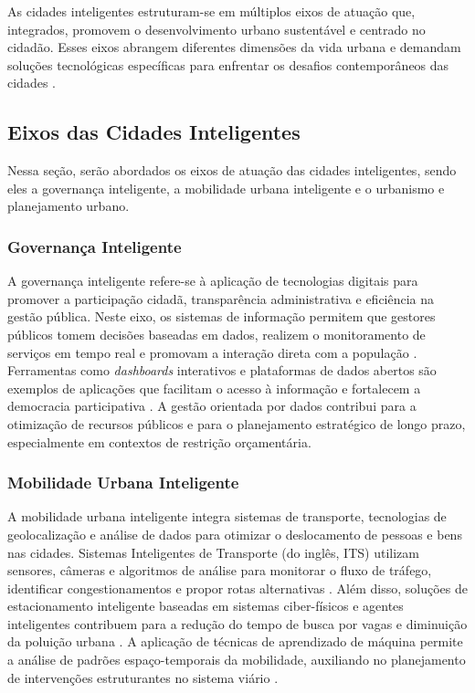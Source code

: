 As cidades inteligentes estruturam-se em múltiplos eixos de atuação que, integrados, promovem 
o desenvolvimento urbano sustentável e centrado no cidadão. Esses eixos abrangem diferentes 
dimensões da vida urbana e demandam soluções tecnológicas específicas para enfrentar os 
desafios contemporâneos das cidades \cite{CARVALHO2024}.

\subsection{Eixos das Cidades Inteligentes}

Nessa seção, serão abordados os eixos de atuação das cidades inteligentes, sendo eles a 
governança inteligente, a mobilidade urbana inteligente e o urbanismo e planejamento urbano.

\subsubsection{Governança Inteligente}

A governança inteligente refere-se à aplicação de tecnologias digitais para promover a 
participação cidadã, transparência administrativa e eficiência na gestão pública. Neste eixo, 
os sistemas de informação permitem que gestores públicos tomem decisões baseadas em dados, 
realizem o monitoramento de serviços em tempo real e promovam a interação direta com a 
população \cite{WEISS2015}. Ferramentas como \textit{dashboards} interativos e plataformas de dados 
abertos são exemplos de aplicações que facilitam o acesso à informação e fortalecem a 
democracia participativa \cite{DIAS2019}. A gestão orientada por dados contribui para a 
otimização de recursos públicos e para o planejamento estratégico de longo prazo, especialmente 
em contextos de restrição orçamentária.

\subsubsection{Mobilidade Urbana Inteligente}

A mobilidade urbana inteligente integra sistemas de transporte, tecnologias de 
geolocalização e análise de dados para otimizar o deslocamento de pessoas e bens nas cidades. 
Sistemas Inteligentes de Transporte (do inglês, \gls{ITS}) 
utilizam sensores, câmeras e algoritmos de análise para monitorar o fluxo de tráfego, identificar 
congestionamentos e propor rotas alternativas \cite{COSTA2023}. Além disso, soluções de 
estacionamento inteligente baseadas em sistemas ciber-físicos e agentes inteligentes contribuem 
para a redução do tempo de busca por vagas e diminuição da poluição urbana \cite{BOTELHO2019}. 
A aplicação de técnicas de aprendizado de máquina permite a análise de padrões espaço-temporais 
da mobilidade, auxiliando no planejamento de intervenções estruturantes no sistema viário 
\cite{MELONIO2021}.

